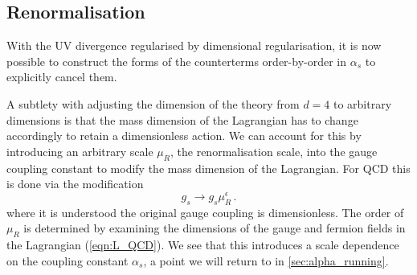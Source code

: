 \documentclass[main.tex]{subfiles}
\begin{document}
\subsection{Renormalisation}
    With the UV divergence regularised by dimensional
    regularisation, it is now possible to construct the forms
    of the counterterms order-by-order in $\alpha_{s}$ to
    explicitly cancel them.

    A subtlety with adjusting the dimension of the theory
    from $d=4$ to arbitrary dimensions is that the mass dimension
    of the Lagrangian has to change accordingly to retain a
    dimensionless action. We can account for this by
    introducing an arbitrary scale $\mu_{R}$, the renormalisation
    scale, into the gauge coupling
    constant to modify the mass dimension of the Lagrangian.
    For QCD this is done via the modification
    \begin{equation}\label{eqn:dimensionful_coupling}
        g_{s} \rightarrow g_{s}\mu_{R}^{\epsilon} \, .
    \end{equation}
    where it is understood the original gauge coupling is
    dimensionless. The order of $\mu_{R}$ is determined by examining
    the dimensions of the gauge and fermion fields
    in the Lagrangian (\ref{eqn:L_QCD}).
    We see that this introduces a scale dependence
    on the coupling constant $\alpha_{s}$, a point we will return
    to in \ref{sec:alpha_running}.
\end{document}
